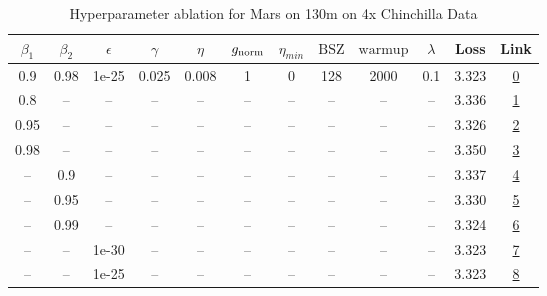 \begin{table}[H]
\centering
\caption{Hyperparameter ablation for Mars on 130m on 4x Chinchilla Data}
\label{tab:ablation_mars_130m_on_4x_chinchilla_data}
\begin{tabular}{cccccccccccc}
\toprule
$\beta_1$ & $\beta_2$ & $\epsilon$ & $\gamma$ & $\eta$ & $g_{\mathrm{norm}}$ & $\eta_{min}$ & $\mathrm{BSZ}$ & $\mathrm{warmup}$ & $\lambda$ & Loss & Link \\
\midrule
0.9 & 0.98 & 1e-25 & 0.025 & 0.008 & 1 & 0 & 128 & 2000 & 0.1 & 3.323 & \href{https://wandb.ai/marin-community/optimizer-scaling/runs/sweep-130m-10B-marsb8cf3flr0.008-wd0.1-minlr0-warmup2000-b10.9-b-5a2278}{0} \\
\midrule
0.8 & -- & -- & -- & -- & -- & -- & -- & -- & -- & 3.336 & \href{https://wandb.ai/marin-community/optimizer-scaling/runs/sweep-130m-10B-marsa0cf09lr0.008-wd0.1-minlr0-warmup2000-b10.8-b-2eb328}{1} \\
0.95 & -- & -- & -- & -- & -- & -- & -- & -- & -- & 3.326 & \href{https://wandb.ai/marin-community/optimizer-scaling/runs/sweep-130m-10B-mars1ddcddlr0.008-wd0.1-minlr0-warmup2000-b10.95--f05d16}{2} \\
0.98 & -- & -- & -- & -- & -- & -- & -- & -- & -- & 3.350 & \href{https://wandb.ai/marin-community/optimizer-scaling/runs/sweep-130m-10B-mars1125cblr0.008-wd0.1-minlr0-warmup2000-b10.98--06efb4}{3} \\
-- & 0.9 & -- & -- & -- & -- & -- & -- & -- & -- & 3.337 & \href{https://wandb.ai/marin-community/optimizer-scaling/runs/sweep-130m-10B-marsbf9ae8lr0.008-wd0.1-minlr0-warmup2000-b10.9-b-77968a}{4} \\
-- & 0.95 & -- & -- & -- & -- & -- & -- & -- & -- & 3.330 & \href{https://wandb.ai/marin-community/optimizer-scaling/runs/sweep-130m-10B-marsa8c868lr0.008-wd0.1-minlr0-warmup2000-b10.9-b-e43f81}{5} \\
-- & 0.99 & -- & -- & -- & -- & -- & -- & -- & -- & 3.324 & \href{https://wandb.ai/marin-community/optimizer-scaling/runs/sweep-130m-10B-mars7e0a59lr0.008-wd0.1-minlr0-warmup2000-b10.9-b-53135f}{6} \\
-- & -- & 1e-30 & -- & -- & -- & -- & -- & -- & -- & 3.323 & \href{https://wandb.ai/marin-community/optimizer-scaling/runs/sweep-130m-10B-marsb8cf3flr0.008-wd0.1-minlr0-warmup2000-b10.9-b-5a2278}{7} \\
-- & -- & 1e-25 & -- & -- & -- & -- & -- & -- & -- & 3.323 & \href{https://wandb.ai/marin-community/optimizer-scaling/runs/sweep-130m-10B-marsb8cf3flr0.008-wd0.1-minlr0-warmup2000-b10.9-b-5a2278}{8} \\

\end{tabular}
\end{table}
